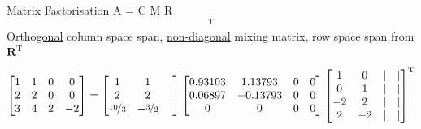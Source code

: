 \documentclass[mathserif, aspectratio=1610]{intbeamer}
\begin{document}
\begin{frame}{Matrix Factorisation A = C M R}
$$^\mathrm{T}
$$
\pause
Ortho\underline{gonal} column space span, \underline{non-diagonal} mixing matrix, row space span from $\bm{R}^\mathrm{T}$
$$
\begin{bmatrix}
1 & 1 & 0 & 0\\
2 & 2 & 0 & 0\\
3 & 4 & 2 & -2
\end{bmatrix}
=
\begin{bmatrix}
1 & 1 & |\\
2 & 2 & |\\
\nicefrac{10}{3} & -\nicefrac{3}{2} & |
\end{bmatrix}
\begin{bmatrix}
0.93103 & 1.13793 & 0 & 0\\
0.06897 & -0.13793 & 0 & 0\\
0 & 0 & 0 & 0\\
\end{bmatrix}
\begin{bmatrix}
1&0 & | & |\\
0&1 & | & |\\
-2&2 & | & |\\
2&-2 & | & |\\
\end{bmatrix}
^\mathrm{T}
$$

\end{frame}
\end{document}
